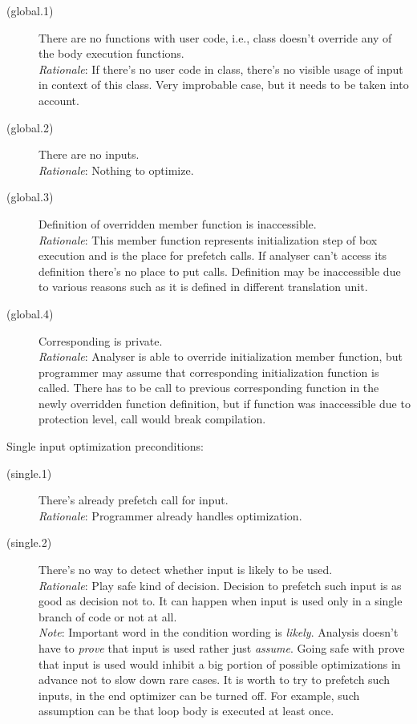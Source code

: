 \begin{description}
\item[(global.1)]{There are no functions with user code, i.e., class doesn't override any of the body execution functions.\\
\emph{Rationale}: If there's no user code in class, there's no visible usage of input in context of this class. Very improbable case, but it needs to be taken into account. 
}

\item[(global.2)]{There are no inputs.\\
\emph{Rationale}: Nothing to optimize. 
}

\item[(global.3)]{Definition of overridden  member function is inaccessible.\\
\emph{Rationale}: This member function represents initialization step of box execution and is the place for prefetch calls. If analyser can't access its definition there's no place to put calls. Definition may be inaccessible due to various reasons such as it is defined in different translation unit.
}

\item[(global.4)]{Corresponding  is private.\\
\emph{Rationale}: Analyser is able to override initialization member function, but programmer may assume that corresponding initialization function is called. There has to be call to previous corresponding function in the newly overridden function definition, but if function was inaccessible due to protection level, call would break compilation.
}
\end{description}

Single input optimization preconditions:

\begin{description}
\item[(single.1)]{There's already prefetch call for input.\\
\emph{Rationale}: Programmer already handles optimization.
}

\item[(single.2)]{There's no way to detect whether input is likely to be used.\\
\emph{Rationale}: Play safe kind of decision. Decision to prefetch such input is as good as decision not to. It can happen when input is used only in a single branch of code or not at all.\\
\emph{Note}: Important word in the condition wording is \emph{likely}. Analysis doesn't have to \emph{prove} that input is used rather just \emph{assume}. Going safe with prove that input is used would inhibit a big portion of possible optimizations in advance not to slow down rare cases. It is worth to try to prefetch such inputs, in the end optimizer can be turned off. For example, such assumption can be that loop body is executed at least once.
}
\end{description}

